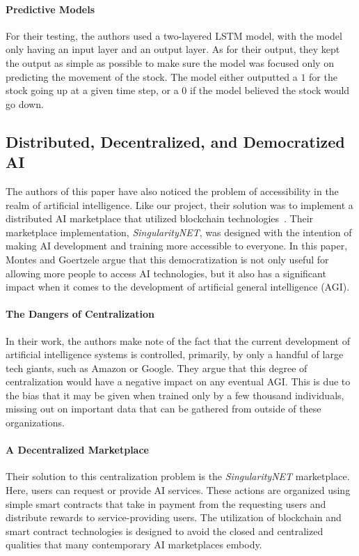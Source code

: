 \documentclass{ledger}
\begin{document}
\paragraph{Predictive Models}
For their testing, the authors used a two-layered LSTM model, with the model only having an input layer
and an output layer.  As for their output, they kept the output as simple as possible to make sure the model
was focused only on predicting the movement of the stock.  The model either outputted a $1$ for the stock going up at
a given time step, or a $0$ if the model believed the stock would go down.


\subsection{Distributed, Decentralized, and Democratized AI}

The authors of this paper have also noticed the problem of accessibility in the realm of artificial intelligence.  Like
our project, their solution was to implement a distributed AI marketplace that utilized blockchain
technologies~\cite{democratizedAI}.  Their marketplace implementation, \textit{SingularityNET}, was designed with the
intention of making AI development and training more accessible to everyone.  In this paper, Montes and Goertzele argue
that this democratization is not only useful for allowing more people to access AI technologies, but it also has a
significant impact when it comes to the development of artificial general intelligence (AGI).

\paragraph{The Dangers of Centralization}  In their work, the authors make note of the fact that the current development
of artificial intelligence systems is controlled, primarily, by only a handful of large tech giants, such as Amazon or
Google. They argue that this degree of centralization would have a negative impact on any eventual AGI.  This is due
to the bias that it may be given when trained only by a few thousand individuals, missing out on important data that can
be gathered from outside of these organizations.

\paragraph{A Decentralized Marketplace}  Their solution to this centralization problem is the \textit{SingularityNET}
marketplace.  Here, users can request or provide AI services.  These actions are organized using simple smart contracts
that take in payment from the requesting users and distribute rewards to service-providing users.  The utilization of
blockchain and smart contract technologies is designed to avoid the closed and centralized qualities that many contemporary
AI marketplaces embody.
\end{document}
